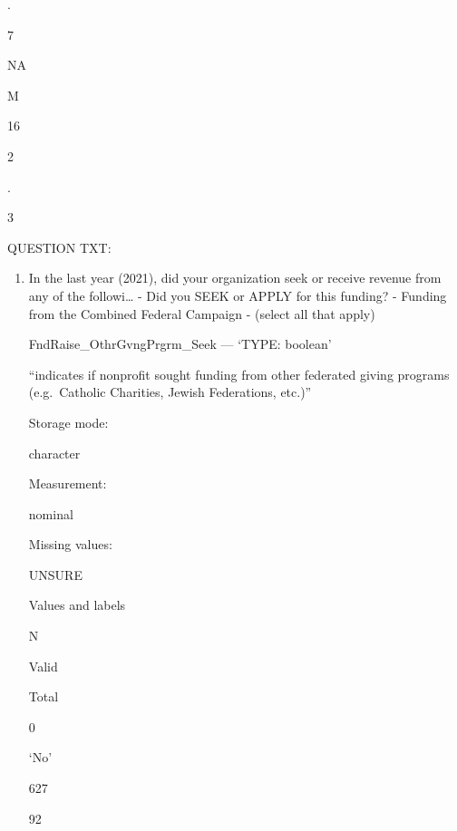 \documentclass[
  letterpaper,
]{scrbook}
\providecommand{\tightlist}{%
  \setlength{\itemsep}{0pt}\setlength{\parskip}{0pt}}\usepackage{longtable,booktabs,array}
\begin{document}
\begin{enumerate}
\begin{enumerate}
\begin{enumerate}
\begin{enumerate}
\begin{enumerate}
\begin{enumerate}
\begin{enumerate}
\begin{enumerate}
\begin{enumerate}
\begin{enumerate}
\begin{enumerate}
                      .

                      7

                      NA

                      M

                      16

                      2

                      .

                      3

                      QUESTION TXT:

                      \begin{enumerate}
                      \def\labelenumxii{\arabic{enumxii}.}
                      \tightlist
                      \item
                        In the last year (2021), did your organization
                        seek or receive revenue from any of the
                        followi\ldots{} - Did you SEEK or APPLY for this
                        funding? - Funding from the Combined Federal
                        Campaign - (select all that apply)

                        FndRaise\_OthrGvngPrgrm\_Seek --- {`TYPE:
                        boolean'}

                        ``indicates if nonprofit sought funding from
                        other federated giving programs (e.g.~Catholic
                        Charities, Jewish Federations, etc.)''

                        Storage mode:

                        character

                        Measurement:

                        nominal

                        Missing values:

                        UNSURE

                        Values and labels

                        N

                        Valid

                        Total

                        0

                        `No'

                        627

                        92


\end{enumerate}
\end{enumerate}
\end{enumerate}
\end{enumerate}
\end{enumerate}
\end{enumerate}
\end{enumerate}
\end{enumerate}
\end{enumerate}
\end{enumerate}
\end{enumerate}
\end{enumerate}
\end{document}
